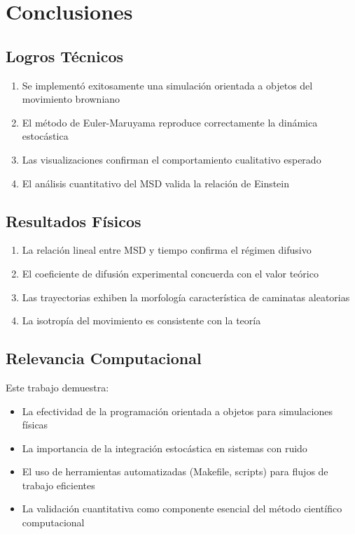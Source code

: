 \documentclass[11pt,a4paper]{article}
\begin{document}
\section{Conclusiones}

\subsection{Logros Técnicos}
\begin{enumerate}
    \item Se implementó exitosamente una simulación orientada a objetos del movimiento browniano
    \item El método de Euler-Maruyama reproduce correctamente la dinámica estocástica
    \item Las visualizaciones confirman el comportamiento cualitativo esperado
    \item El análisis cuantitativo del MSD valida la relación de Einstein
\end{enumerate}

\subsection{Resultados Físicos}
\begin{enumerate}
    \item La relación lineal entre MSD y tiempo confirma el régimen difusivo
    \item El coeficiente de difusión experimental concuerda con el valor teórico
    \item Las trayectorias exhiben la morfología característica de caminatas aleatorias
    \item La isotropía del movimiento es consistente con la teoría
\end{enumerate}

\subsection{Relevancia Computacional}
Este trabajo demuestra:
\begin{itemize}
    \item La efectividad de la programación orientada a objetos para simulaciones físicas
    \item La importancia de la integración estocástica en sistemas con ruido
    \item El uso de herramientas automatizadas (Makefile, scripts) para flujos de trabajo eficientes
    \item La validación cuantitativa como componente esencial del método científico computacional
\end{itemize}
\end{document}
